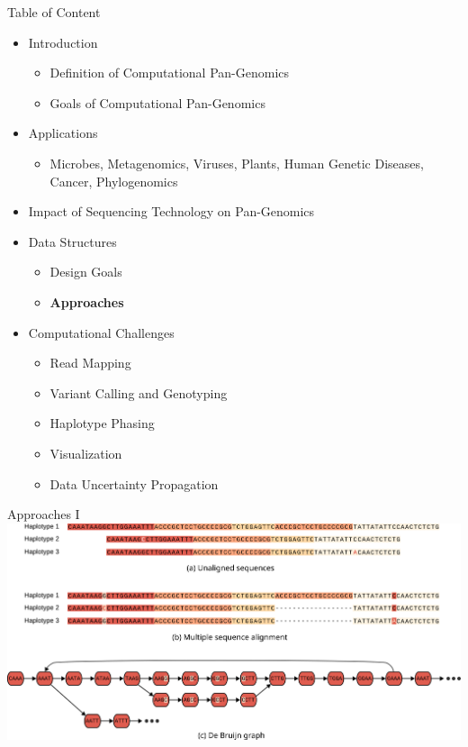 \documentclass[notes=hide]{beamer}
\newcommand{\0}{\ensuremath{\mathtt{0}}}
\newcommand{\1}{\ensuremath{\mathtt{1}}}
\begin{document}
\begin{frame}{Table of Content}
\begin{itemize}
 \item Introduction
 \begin{itemize}
    \item Definition of Computational Pan-Genomics
    \item Goals of Computational Pan-Genomics
 \end{itemize}
\item Applications
 \begin{itemize}
    \item Microbes, Metagenomics, Viruses, Plants, Human Genetic Diseases, Cancer, Phylogenomics
 \end{itemize}
\item Impact of Sequencing Technology on Pan-Genomics
\item Data Structures
 \begin{itemize}
    \item Design Goals
    \item {\color{red}\textbf{Approaches}}
 \end{itemize}
\item Computational Challenges
 \begin{itemize}
    \item Read Mapping
    \item Variant Calling and Genotyping
    \item Haplotype Phasing
    \item Visualization
    \item Data Uncertainty Propagation
 \end{itemize}
\end{itemize}
\end{frame}

\begin{frame}{Approaches I}
\includegraphics[width=.95\textwidth]{figs/paper/data_structures1}
\end{frame}
\end{document}

